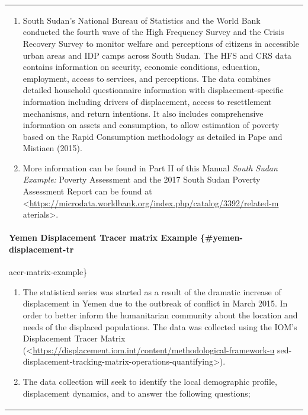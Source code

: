 \documentclass[
]{article}
\begin{document}
\begin{longtable}[]{@{}l@{}}
\toprule
\endhead
\begin{minipage}[t]{0.97\columnwidth}\raggedright
\begin{enumerate}
\def\labelenumi{\arabic{enumi}.}
\setcounter{enumi}{451}
\item
  South Sudan's National Bureau of Statistics and the World Bank
  conducted the fourth wave of the High Frequency Survey and the
  Crisis Recovery Survey to monitor welfare and perceptions of
  citizens in accessible urban areas and IDP camps across South
  Sudan. The HFS and CRS data contains information on security,
  economic conditions, education, employment, access to services,
  and perceptions. The data combines detailed household
  questionnaire information with displacement-specific information
  including drivers of displacement, access to resettlement
  mechanisms, and return intentions. It also includes comprehensive
  information on assets and consumption, to allow estimation of
  poverty based on the Rapid Consumption methodology as detailed in
  Pape and Mistiaen (2015).
\item
  More information can be found in Part II of this Manual \emph{South
  Sudan Example:} Poverty Assessment and the 2017 South Sudan
  Poverty Assessment Report can be found at
  \textless{}\url{https://microdata.worldbank.org/index.php/catalog/3392/related-m}
  aterials\textgreater.
\end{enumerate}

\hypertarget{yemen-displacement-tracer-matrix-example-yemen-displacement-tr-1}{%
\paragraph{Yemen Displacement Tracer matrix Example \{\#yemen-displacement-tr}\label{yemen-displacement-tracer-matrix-example-yemen-displacement-tr-1}}

acer-matrix-example\}

\begin{enumerate}
\def\labelenumi{\arabic{enumi}.}
\setcounter{enumi}{453}
\item
  The statistical series was started as a result of the dramatic
  increase of displacement in Yemen due to the outbreak of conflict
  in March 2015. In order to better inform the humanitarian
  community about the location and needs of the displaced
  populations. The data was collected using the IOM's Displacement
  Tracer Matrix
  (\textless{}\url{https://displacement.iom.int/content/methodological-framework-u}
  sed-displacement-tracking-matrix-operations-quantifying\textgreater).
\item
  The data collection will seek to identify the local demographic
  profile, displacement dynamics, and to answer the following
  questions;
\end{enumerate}


\end{minipage}
\end{longtable}
\end{document}
